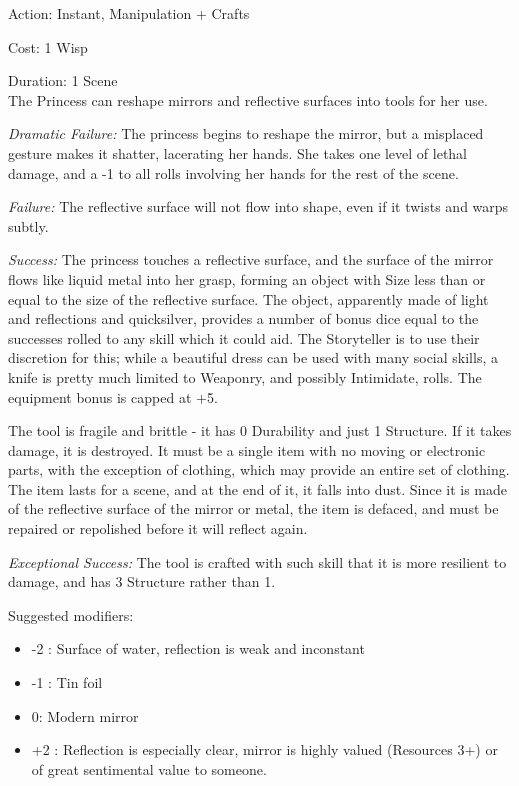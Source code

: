 \noindent Action: Instant, Manipulation + Crafts

\noindent Cost: 1 Wisp

\noindent Duration: 1 Scene\\ 

\noindent The Princess can reshape mirrors and reflective surfaces into tools for her use.

    \emph{Dramatic Failure:} The princess begins to reshape the mirror, but a misplaced gesture makes it shatter, lacerating her hands. She takes one level of lethal damage, and a -1 to all rolls involving her hands for the rest of the scene.

    \emph{Failure:} The reflective surface will not flow into shape, even if it twists and warps subtly.

    \emph{Success:} The princess touches a reflective surface, and the surface of the mirror flows like liquid metal into her grasp, forming an object with Size less than or equal to the size of the reflective surface. The object, apparently made of light and reflections and quicksilver, provides a number of bonus dice equal to the successes rolled to any skill which it could aid. The Storyteller is to use their discretion for this; while a beautiful dress can be used with many social skills, a knife is pretty much limited to Weaponry, and possibly Intimidate, rolls. The equipment bonus is capped at +5.

    The tool is fragile and brittle - it has 0 Durability and just 1 Structure. If it takes damage, it is destroyed. It must be a single item with no moving or electronic parts, with the exception of clothing, which may provide an entire set of clothing. The item lasts for a scene, and at the end of it, it falls into dust. Since it is made of the reflective surface of the mirror or metal, the item is defaced, and must be repaired or repolished before it will reflect again.

    \emph{Exceptional Success:} The tool is crafted with such skill that it is more resilient to damage, and has 3 Structure rather than 1.
    
\noindent Suggested modifiers:

\begin{itemize}\item -2 : Surface of water, reflection is weak and inconstant
\item -1 : Tin foil
\item 0: Modern mirror
\item +2 : Reflection is especially clear, mirror is highly valued (Resources 3+) or of great sentimental value to someone.\end{itemize}
    


